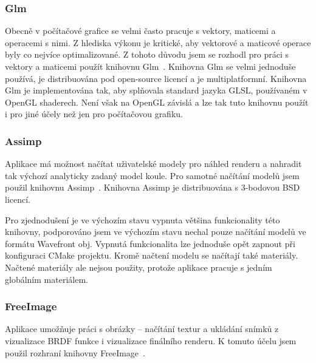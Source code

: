 \documentclass[czech,master]{diploma}
\begin{document}
\subsubsection{Glm}
Obecně v počítačové grafice se velmi často pracuje s vektory, maticemi a operacemi s nimi. Z hlediska výkonu je kritické, aby vektorové a maticové operace byly co nejvíce optimalizované. Z tohoto důvodu jsem se rozhodl pro práci s vektory a maticemi použít knihovnu Glm~\cite{sourceGlm}. Knihovna Glm se velmi jednoduše používá, je distribuována pod open-source licencí a je multiplatformní. Knihovna Glm je implementována tak, aby splňovala standard jazyka GLSL, používaném v OpenGL shaderech. Není však na OpenGL závislá a lze tak tuto knihovnu použít i pro jiné účely než jen pro počítačovou grafiku.

\subsubsection{Assimp}
Aplikace má možnost načítat uživatelské modely pro náhled renderu a nahradit tak výchozí analyticky zadaný model koule. Pro samotné načítání modelů jsem použil knihovnu Assimp~\cite{sourceAssimp}. Knihovna Assimp je distribuována s 3-bodovou BSD licencí.\par
Pro zjednodušení je ve výchozím stavu vypnuta většina funkcionality této knihovny, podporováno jsem ve výchozím stavu nechal pouze načítání modelů ve formátu Wavefront obj. Vypnutá funkcionalita lze jednoduše opět zapnout při konfiguraci CMake projektu. Kromě načtení modelu se načítají také materiály. Načtené materiály ale nejsou použity, protože aplikace pracuje s jedním globálním materiálem.

\subsubsection{FreeImage}
Aplikace umožňuje práci s obrázky -- načítání textur a ukládání snímků z vizualizace BRDF funkce i vizualizace finálního renderu. K tomuto účelu jsem použil rozhraní knihovny FreeImage~\cite{sourceFreeImage}.
\end{document}
